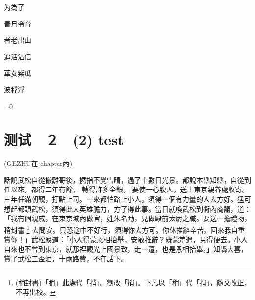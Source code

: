 {为為了

青月令育 %

者老出山

追活沾信

華女紫瓜

波稃浮


\ifnum{}=0

\chapter{测试　２　(2) test}

(GEZHU在 chapter內)

\begin{withgezhu}


話說武松自從搬離哥後，撚指不覺雪晴，過了十數日光景。都說本縣知縣，自從到任以來，都得二年有餘，
轉得許多金銀，
要使一心腹人，送上東京親眷處收寄。三年任滿朝覲，打點上司。一來都怕路上小人，須得一個有力量的人去方好。猛可想起都頭武松，須得此人英雄膽力，方了得此事。當日就喚武松到衙內商議，道：「我有個親戚，在東京城內做官，姓朱名勔，見做殿前太尉之職。要送一擔禮物，
稍封書
\footnote{(稍封書)「稍」此處代「捎」。劉改「捎」。下凡以「稍」代「捎」，隨文改正，不再出校。}
去問安。只恐途中不好行，須得你去方可。你休推辭辛苦，回來我自重賞你！」武松應道：「小人得蒙恩相抬舉，安敢推辭？既蒙差遣，只得便去。小人自來也不曾到東京，就那裡觀光上國景致，走一遭，也是恩相抬舉。」知縣大喜，賞了武松三盃酒，十兩路費，不在話下。

\end{withgezhu}







}
